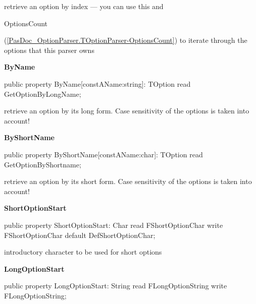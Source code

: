 \documentclass{report}
\newif\ifpdf
\begin{document}
\begin{list}{}
\begin{flushleft}
\ifpdf
\end{flushleft}
\fi


\par retrieve an option by index --- you can use this and \begin{ttfamily}OptionsCount\end{ttfamily}(\ref{PasDoc_OptionParser.TOptionParser-OptionsCount}) to iterate through the options that this parser owns\label{PasDoc_OptionParser.TOptionParser-ByName}
\item[\textbf{ByName}\hfill]
\ifpdf
\begin{flushleft}
\fi
\begin{ttfamily}
public property ByName[constAName:string]: TOption read GetOptionByLongName;\end{ttfamily}

\ifpdf
\end{flushleft}
\fi


\par retrieve an option by its long form. Case sensitivity of the options is taken into account!\label{PasDoc_OptionParser.TOptionParser-ByShortName}
\item[\textbf{ByShortName}\hfill]
\ifpdf
\begin{flushleft}
\fi
\begin{ttfamily}
public property ByShortName[constAName:char]: TOption read GetOptionByShortname;\end{ttfamily}

\ifpdf
\end{flushleft}
\fi


\par retrieve an option by its short form. Case sensitivity of the options is taken into account!\label{PasDoc_OptionParser.TOptionParser-ShortOptionStart}
\item[\textbf{ShortOptionStart}\hfill]
\ifpdf
\begin{flushleft}
\fi
\begin{ttfamily}
public property ShortOptionStart: Char read FShortOptionChar write FShortOptionChar default DefShortOptionChar;\end{ttfamily}

\ifpdf
\end{flushleft}
\fi


\par introductory character to be used for short options\label{PasDoc_OptionParser.TOptionParser-LongOptionStart}
\item[\textbf{LongOptionStart}\hfill]
\ifpdf
\begin{flushleft}
\fi
\begin{ttfamily}
public property LongOptionStart: String read FLongOptionString write FLongOptionString;\end{ttfamily}


\end{flushleft}
\end{list}
\end{document}
